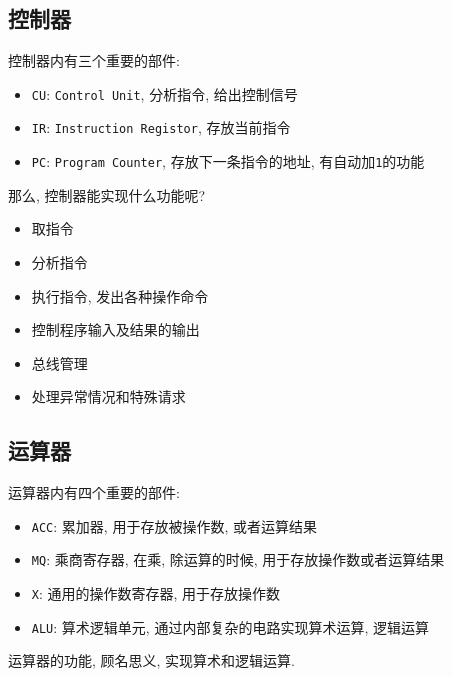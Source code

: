 \subsection{控制器}
控制器内有三个重要的部件:
\begin{itemize}
\item \verb|CU|: \verb|Control Unit|, 分析指令, 给出控制信号
\item \verb|IR|: \verb|Instruction Registor|, 存放当前指令
\item \verb|PC|: \verb|Program Counter|, 存放下一条指令的地址, 有自动加\verb|1|的功能
\end{itemize}\par
那么, 控制器能实现什么功能呢?
\begin{itemize}
\item 取指令
\item 分析指令
\item 执行指令, 发出各种操作命令
\item 控制程序输入及结果的输出
\item 总线管理
\item 处理异常情况和特殊请求
\end{itemize}
\subsection{运算器}
运算器内有四个重要的部件:
\begin{itemize}
\item \verb|ACC|: 累加器, 用于存放被操作数, 或者运算结果
\item \verb|MQ|: 乘商寄存器, 在乘, 除运算的时候, 用于存放操作数或者运算结果
\item \verb|X|: 通用的操作数寄存器, 用于存放操作数
\item \verb|ALU|: 算术逻辑单元, 通过内部复杂的电路实现算术运算, 逻辑运算
\end{itemize}
运算器的功能, 顾名思义, 实现算术和逻辑运算.
